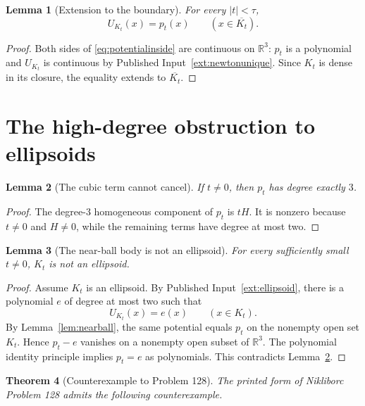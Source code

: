 \documentclass[11pt]{article}
\newtheorem{theorem}{Theorem}[section]
\newtheorem{lemma}[theorem]{Lemma}
\theoremstyle{definition}
\theoremstyle{remark}
\newcommand{\R}{\mathbb{R}}
\newcommand{\1}{\mathbf{1}}
\begin{document}
\begin{lemma}[Extension to the boundary]\label{lem:boundary}
For every $|t|<\tau$,
\begin{equation}\label{eq:boundarypotential}
 U_{K_t}(x)=p_t(x)\qquad(x\in\overline{K_t}).
\end{equation}
\end{lemma}

\begin{proof}
Both sides of \eqref{eq:potentialinside} are continuous on $\R^3$: $p_t$ is a polynomial and $U_{K_t}$ is continuous by Published Input~\ref{ext:newtonunique}. Since $K_t$ is dense in its closure, the equality extends to $\overline{K_t}$.
\end{proof}

\section{The high-degree obstruction to ellipsoids}

\begin{lemma}[The cubic term cannot cancel]\label{lem:degree}
If $t\ne0$, then $p_t$ has degree exactly $3$.
\end{lemma}

\begin{proof}
The degree-$3$ homogeneous component of $p_t$ is $tH$. It is nonzero because $t\ne0$ and $H\ne0$, while the remaining terms have degree at most two.
\end{proof}

\begin{lemma}[The near-ball body is not an ellipsoid]\label{lem:nonellipsoid}
For every sufficiently small $t\ne0$, $K_t$ is not an ellipsoid.
\end{lemma}

\begin{proof}
Assume $K_t$ is an ellipsoid. By Published Input~\ref{ext:ellipsoid}, there is a polynomial $e$ of degree at most two such that
\[
 U_{K_t}(x)=e(x)\qquad(x\in K_t).
\]
By Lemma~\ref{lem:nearball}, the same potential equals $p_t$ on the nonempty open set $K_t$. Hence $p_t-e$ vanishes on a nonempty open subset of $\R^3$. The polynomial identity principle implies $p_t=e$ as polynomials. This contradicts Lemma~\ref{lem:degree}.
\end{proof}

\begin{theorem}[Counterexample to Problem 128]\label{thm:counterexample128}
The printed form of Nikliborc Problem 128 admits the following counterexample.
\end{theorem}
\end{document}
